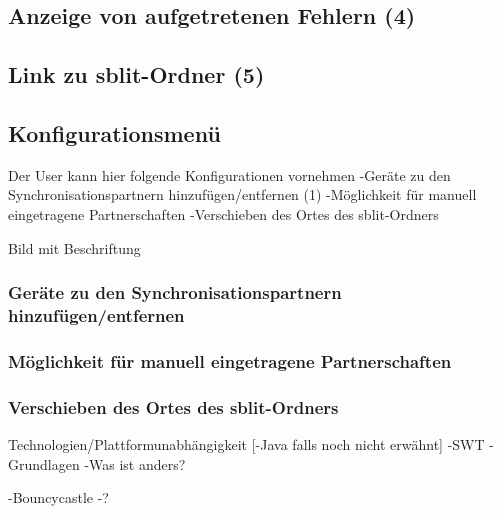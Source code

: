 \subsection{Anzeige von aufgetretenen Fehlern (4)}

\subsection{Link zu sblit-Ordner (5)}

\subsection{Konfigurationsmenü}
Der User kann hier folgende Konfigurationen vornehmen
-Geräte zu den Synchronisationspartnern hinzufügen/entfernen (1)
-Möglichkeit für manuell eingetragene Partnerschaften
-Verschieben des Ortes des sblit-Ordners

{Bild mit Beschriftung}

%
%
\subsubsection{Geräte zu den Synchronisationspartnern hinzufügen/entfernen}

\subsubsection{Möglichkeit für manuell eingetragene Partnerschaften}

\subsubsection{Verschieben des Ortes des sblit-Ordners}

Technologien/Plattformunabhängigkeit
[-Java falls noch nicht erwähnt]
-SWT
  -Grundlagen
  -Was ist anders?

-Bouncycastle
  -?
